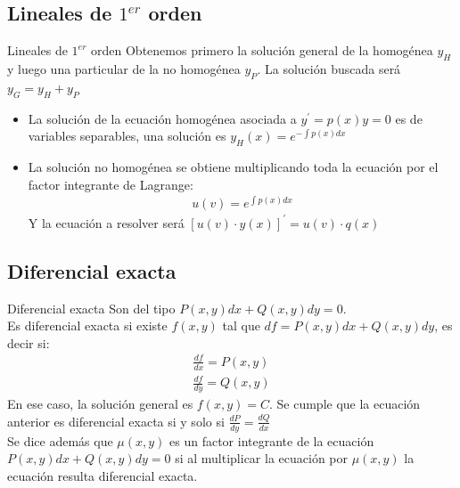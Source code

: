 \documentclass[a4paper, twoside]{article}
\numberwithin{equation}{section}
\numberwithin{figure}{section}
\numberwithin{table}{section}
\begin{document}
\subsection{Lineales de $1^{er}$ orden}
\begin{definicion*}{Lineales de $1^{er}$ orden}
	Obtenemos primero la solución general de la homogénea $y_H$ y luego una particular de la no homogénea $y_P$. La solución buscada será $y_G=y_H+y_P$
	\begin{itemize}
		\item La solución de la ecuación homogénea asociada a $y^\prime=p(x)y=0$ es de variables separables, una solución es $y_H(x)=e^{-\int p(x)dx}$
		\item La solución no homogénea se obtiene multiplicando toda la ecuación por el factor integrante de Lagrange:
		\begin{align}
			u(v)=e^{\int p(x) dx}
		\end{align}
		Y la ecuación a resolver será $[u(v) \cdot y(x)]^\prime=u(v) \cdot q(x)$
	\end{itemize}
\end{definicion*}

\subsection{Diferencial exacta}
\begin{definicion*}{Diferencial exacta}
	Son del tipo $P(x,y)dx+Q(x,y)dy=0$.\\
	
	Es diferencial exacta si existe $f(x,y)$ tal que $df=P(x,y)dx+Q(x,y)dy$, es decir si:
	\begin{align}
		\frac{df}{dx}=P(x,y) \\
		\frac{df}{dy}=Q(x,y)
	\end{align}
	En ese caso, la solución general es $f(x,y)=C$. Se cumple que la ecuación anterior es diferencial exacta si y solo si $\frac{dP}{dy}=\frac{dQ}{dx}$\\
	
	Se dice además que $\mu(x,y)$ es un factor integrante de la ecuación $P(x,y)dx+Q(x,y)dy=0$ si al multiplicar la ecuación por $\mu(x,y)$ la ecuación resulta diferencial exacta.
\end{definicion*}
\end{document}
